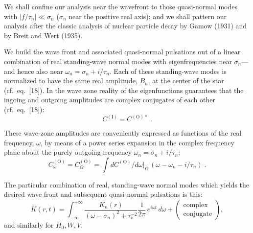 \documentclass[12pt]{article}
\begin{document}
We shall confine our analysis near the wavefront to those quasi-normal modes with
$|f/\tau_{n}| \ll \sigma_{n}$ ($\sigma_{n}$ near the positive real axis); and we shall pattern our analysis after the
classic analysis of nuclear particle decay by Gamow (1931) and by Breit and Wert
(1935).

We build the wave front and associated quasi-normal pulsations out of a linear
combination of real standing-wave normal modes with eigenfrequencies near $\sigma_{n}$---and
hence also near $\omega_{n} = \sigma_{n} + i/\tau_{n}$. Each of these standing-wave modes is normalized to
have the same real amplitude, $B_{n}$, at the center of the star (cf.\ eq.\ [18]). In the wave
zone reality of the eigenfunctions guarantees that the ingoing and outgoing amplitudes
are complex conjugates of each other (cf.\ eq.\ [18]):
%
\begin{equation}
  C^{(\mathrm{I})} = C^{(\mathrm{O})*} \;.
  \label{eq:31}
\end{equation}

These wave-zone amplitudes are conveniently expressed as functions of the real frequency, $\omega$, by means of a power series expansion in the complex frequency plane about
the purely outgoing frequency $\omega_{n} = \sigma_{n} + i/\tau_{n}$:
%
\begin{equation}
  C_{\omega}^{(\mathrm{O})} = C_{\Omega}^{(\mathrm{O})} = \int dC^{(\mathrm{O})}/d\omega\big|_{\Omega}\,(\omega - \omega_{n} - i/\tau_{n}) \;.
  \label{eq:32}
\end{equation}

The particular combination of real, standing-wave normal modes which yields the desired wave front and subsequent quasi-normal pulsations is this:
%
\begin{equation}
  K(r,t) = \int_{-\infty}^{+\infty}
    \frac{K_{n}(r)}{(\omega - \sigma_{n})^{2} + \tau_{n}^{-2}}
    \frac{1}{2\pi}\,e^{i\omega t}\,d\omega
  + \begin{pmatrix} \text{complex} \\ \text{conjugate} \end{pmatrix} ,
  \label{eq:33}
\end{equation}
%
and similarly for $H_{0}, W, V$.
\end{document}
